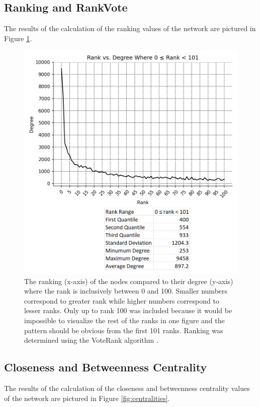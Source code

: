 \documentclass[9pt,twocolumn,twoside]{pnas-new}
\begin{document}
\subsection{Ranking and RankVote} The results of the calculation of the ranking values of the network are pictured in Figure \ref{fig:vote_ranks}.

\begin{figure}
\centering
\includegraphics[width=.8\linewidth]{vote_ranks}
\caption{The ranking (x-axis) of the nodes compared to their degree (y-axis) where the rank is inclusively between 0 and 100. Smaller numbers correspond to greater rank while higher numbers correspond to lesser ranks. Only up to rank 100 was included because it would be impossible to visualize the rest of the ranks in one figure and the pattern should be obvious from the first 101 ranks. Ranking was determined using the VoteRank algorithm \cite{networkxvoteranks}.
}
\label{fig:vote_ranks}
\end{figure}

\subsection{Closeness and Betweenness Centrality} The results of the calculation of the closeness and betweenness centrality values of the network are pictured in Figure \ref{fig:centralities}.
\end{document}
